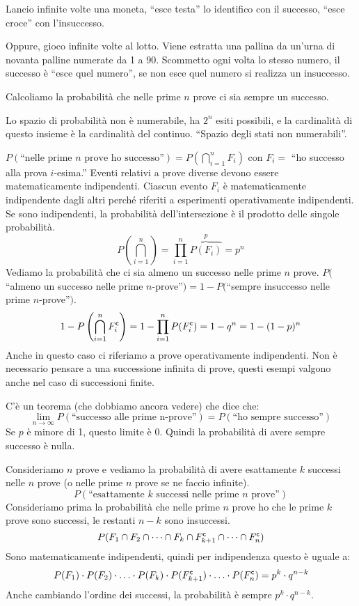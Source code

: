 \begin{exmp}
Lancio infinite volte una moneta, ``esce testa'' lo identifico con il successo, ``esce croce'' con l'insuccesso.

Oppure, gioco infinite volte al lotto. Viene estratta una pallina da un'urna di novanta palline numerate da 1 a 90. Scommetto ogni volta lo stesso numero, il successo \`e ``esce quel numero'', se non esce quel numero si realizza un insuccesso.

Calcoliamo la probabilit\`a che nelle prime $n$ prove ci sia sempre un successo.

Lo spazio di probabilit\`a non \`e numerabile, ha $2^n$ esiti possibili, e la cardinalit\`a di questo insieme \`e la cardinalit\`a del continuo. ``Spazio degli stati non numerabili''.

$P(\text{``nelle prime $n$ prove ho successo''}) = P( \bigcap_{i=1}^{n} F_i )$ con $F_i =$ ``ho successo alla prova $i$-esima.'' Eventi relativi a prove diverse devono essere matematicamente indipendenti. Ciascun evento $F_i$ \`e matematicamente indipendente dagli altri perch\'e riferiti a esperimenti operativamente indipendenti. Se sono indipendenti, la probabilit\`a dell'intersezione \`e il prodotto delle singole probabilit\`a.
\[
P \left( \bigcap_{i=1}^{n} \right) = \prod_{i=1}^{n} \overbrace{P(F_i)}^{p} = p^n
\]
Vediamo la probabilit\`a che ci sia almeno un successo nelle prime $n$ prove. $P($``almeno un successo nelle prime $n$-prove''$) = 1 -  P($``sempre insuccesso nelle prime $n$-prove''$)$.
\[
1 - P \left( \bigcap_{i=1}^{n} F_{i}^{\mathsf{c}} \right) = 1 - \prod_{i=1}^{n} P(F_{i}^{\mathsf{c}}) = 1 - q^n = 1 - (1 - p)^{n}
\]
Anche in questo caso ci riferiamo a prove operativamente indipendenti. Non \`e necessario pensare a una successione infinita di prove, questi esempi valgono anche nel caso di successioni finite.
\end{exmp}

C'\`e un teorema (che dobbiamo ancora vedere) che dice che:
\[
\lim_{n \to \infty} P(\text{``successo alle prime n-prove''}) = P(\text{``ho sempre successo''})
\]
Se $p$ \`e minore di 1, questo limite \`e 0. Quindi la probabilit\`a di avere sempre successo \`e nulla.

Consideriamo $n$ prove e vediamo la probabilit\`a di avere esattamente $k$ successi nelle $n$ prove (o nelle prime $n$ prove se ne faccio infinite).
\[
P(\text{``esattamente $k$ successi nelle prime $n$ prove''})
\]
Consideriamo prima la probabilit\`a che nelle prime $n$ prove ho che le prime $k$ prove sono successi, le restanti $n - k$ sono insuccessi.
\[
P(F_1 \cap F_2 \cap \dots \cap F_k \cap F_{k+1}^{\mathsf{c}} \cap \dots \cap F_{n}^{\mathsf{c}})
\]
Sono matematicamente indipendenti, quindi per indipendenza questo \`e uguale a:
\[
P(F_1) \cdot P(F_2) \cdot \ldots \cdot P(F_k) \cdot P(F_{k+1}^{\mathsf{c}}) \cdot \ldots \cdot P(F_{n}^{\mathsf{c}}) = p^{k} \cdot q^{n-k}
\]
Anche cambiando l'ordine dei successi, la probabilit\`a \`e sempre $p^k \cdot q^{n-k}$.

